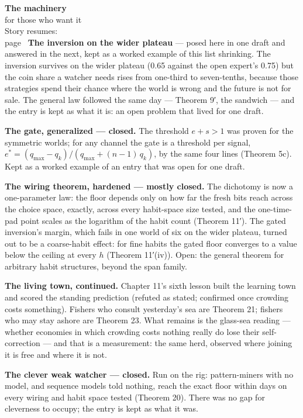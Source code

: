 \begin{machinery}{\textbf{The machinery}\\for those who want it\\[3pt]{\color{muted}Story resumes:\\page~\pageref{ch15-s5}}}
\textbf{The inversion on the wider plateau} --- posed here in one draft and
answered in the next, kept as a worked example of this list shrinking.
The inversion survives on the wider plateau (0.65 against the open
expert's 0.75) but the coin share a watcher needs rises from one-third
to seven-tenths, because those strategies spend their chance where the
world is wrong and the future is not for sale. The general law followed the same
day --- Theorem 9′, the sandwich --- and the entry is kept as what it is:
an open problem that lived for one draft.

\textbf{The gate, generalized --- closed.} The threshold \(e + s > 1\) was proven
for the symmetric worlds; for any channel the gate is a threshold per
signal, \(e^{\ast} = (q_{\max} - q_k)/(q_{\max} + (n-1)\,q_k)\), by the same four lines
(Theorem 5c). Kept as a worked example of an entry that was open for
one draft.

\textbf{The wiring theorem, hardened --- mostly closed.} The dichotomy is now
a one-parameter law: the floor depends only on how far the fresh bits
reach across the choice space, exactly, across every habit-space size
tested, and the one-time-pad point scales as the logarithm of the
habit count (Theorem 11′). The gated inversion's margin,
which fails in one world of six on the wider plateau, turned out to be
a coarse-habit effect: for fine habits the gated floor converges to a
value below the ceiling at every \(h\) (Theorem 11′(iv)). Open: the general
theorem for arbitrary habit structures, beyond the span family.


\textbf{The living town, continued.} Chapter 11's sixth lesson built the learning town
and scored the standing prediction (refuted as stated; confirmed once
crowding costs something). Fishers who consult yesterday's sea are
Theorem 21; fishers who may stay ashore are Theorem 23. What remains
is the glass-sea reading --- whether economies in which crowding costs
nothing really do lose their self-correction --- and that is a
measurement: the same herd, observed where joining it is free and
where it is not.

\textbf{The clever weak watcher --- closed.} Run on the rig: pattern-miners
with no model, and sequence models told nothing, reach the exact floor
within days on every wiring and habit space tested (Theorem 20). There
was no gap for cleverness to occupy; the entry is kept as what it was.


\end{machinery}
